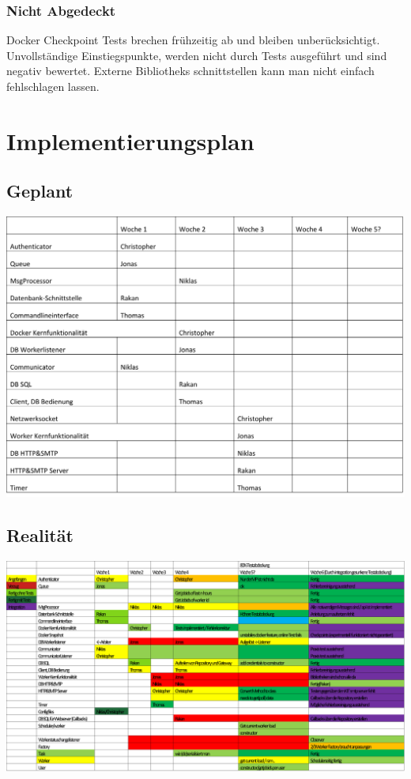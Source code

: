 \documentclass[a4paper,12pt]{article}
\begin{document}
\subsubsection{Nicht Abgedeckt}
Docker Checkpoint Tests brechen frühzeitig ab und bleiben unberücksichtigt.
Unvollständige Einstiegspunkte, werden nicht durch Tests ausgeführt und sind negativ bewertet.
Externe Bibliotheks schnittstellen kann man nicht einfach fehlschlagen lassen.

\clearpage

\section{Implementierungsplan}
\subsection{Geplant}

\includegraphics[width=\textwidth]{orgchart}

\subsection{Realität}

\includegraphics[width=\textwidth]{newchart}

\clearpage
\end{document}
